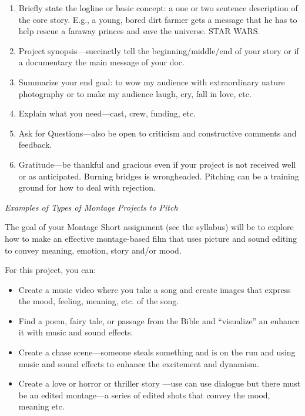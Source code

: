 \documentclass[
]{book}
\providecommand{\tightlist}{%
  \setlength{\itemsep}{0pt}\setlength{\parskip}{0pt}}
\begin{document}
\begin{reflect}
\begin{enumerate}
\item
  Briefly state the logline or basic concept: a one or two sentence description of the core story. E.g., a young, bored dirt farmer gets a message that he has to help rescue a faraway princes and save the universe. STAR WARS.\\
\item
  Project synopsis---succinctly tell the beginning/middle/end of your story or if a documentary the main message of your doc.\\
\item
  Summarize your end goal: to wow my audience with extraordinary nature photography or to make my audience laugh, cry, fall in love, etc.\\
\item
  Explain what you need---cast, crew, funding, etc.\\
\item
  Ask for Questions---also be open to criticism and constructive comments and feedback.\\
\item
  Gratitude---be thankful and gracious even if your project is not received well or as anticipated. Burning bridges is wrongheaded. Pitching can be a training ground for how to deal with rejection.
\end{enumerate}

\emph{Examples of Types of Montage Projects to Pitch}

The goal of your Montage Short assignment (see the syllabus) will be to explore how to make an effective montage-based film that uses picture and sound editing to convey meaning, emotion, story and/or mood.

For this project, you can:

\begin{itemize}
\tightlist
\item
  Create a music video where you take a song and create images that express the mood, feeling, meaning, etc. of the song.
\item
  Find a poem, fairy tale, or passage from the Bible and ``visualize'' an enhance it with music and sound effects.
\item
  Create a chase scene---someone steals something and is on the run and using music and sound effects to enhance the excitement and dynamism.
\item
  Create a love or horror or thriller story ---use can use dialogue but there must be an edited montage---a series of edited shots that convey the mood, meaning etc.
\end{itemize}
\end{reflect}
\end{document}
